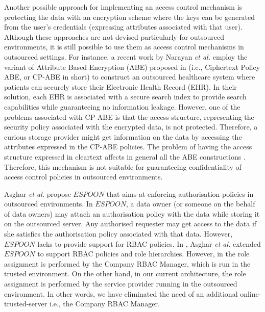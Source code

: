 \documentclass[final,5p,times,twocolumn]{elsarticle}
\begin{document}
Another possible approach for implementing an access control mechanism is protecting the data with an encryption scheme where the keys can be generated from the user's credentials (expressing attributes associated with that user). Although these approaches are not devised particularly for outsourced environments, it is still possible to use them as access control mechanisms in outsourced settings. For instance, a recent work by Narayan \emph{et al.} \cite{Narayan2010} employ the variant of Attribute Based Encryption (ABE) proposed in \cite{Bethencourt2007} (i.e., Ciphertext Policy ABE, or CP-ABE in short) to construct an outsourced healthcare system where patients can securely store their Electronic Health Record (EHR). In their solution, each EHR is associated with a secure search index to provide search capabilities while guaranteeing no information leakage. However, one of the problems associated with CP-ABE is that the access structure, representing the security policy associated with the encrypted data, is not protected. Therefore, a curious storage provider might get information on the data by accessing the attributes expressed in the CP-ABE policies. The problem of having the access structure expressed in cleartext affects in general all the ABE constructions \cite{Sahai2005, Goyal2006, Ostrovsky2007, Bethencourt2007}. Therefore, this mechanism is not suitable for guaranteeing confidentiality of access control policies in outsourced environments.

Asghar \emph{et al.} \cite{Asghar2011ARES} propose $\mathit{ESPOON}$ that aims at enforcing authorisation policies in outsourced environments. In $\mathit{ESPOON}$, a data owner (or someone on the behalf of data owners) may attach an authorisation policy with the data while storing it on the outsourced server. Any authorised requester may get access to the data if she satisfies the authorisation policy associated with that data. However, $\mathit{ESPOON}$ lacks to provide support for RBAC policies. In \cite{Asghar2011CCS}, Asghar \emph{et al.} extended $\mathit{ESPOON}$ to support RBAC policies and role hierarchies. However, in \cite{Asghar2011CCS} the role assignment is performed by the Company RBAC Manager, which is run in the trusted environment. On the other hand, in our current architecture, the role assignment is performed by the service provider running in the outsourced environment. In other words, we have eliminated the need of an additional online-trusted-server i.e., the Company RBAC Manager.
\end{document}
